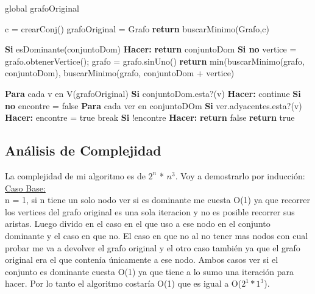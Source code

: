 global grafoOriginal

\begin{codebox}
\li	c = crearConj()
\li	grafoOriginal = Grafo
\li	\textbf{return} buscarMinimo(Grafo,c)
\end{codebox}

\begin{codebox}
\li\textbf{Si} esDominante(conjuntoDom) \textbf{Hacer:} \Do
\li		\textbf{return} conjuntoDom 
\End
\li	\textbf{Si no}  \Do
\li		vertice = grafo.obtenerVertice(); 
\li		grafo = grafo.sinUno()
\li		\textbf{return} min(buscarMinimo(grafo, conjuntoDom), buscarMinimo(grafo, conjuntoDom + vertice)	
\End

\end{codebox}

\begin{codebox}
\li \textbf{Para} cada v en V(grafoOriginal) \Do
\li \textbf{Si} conjuntoDom.esta?(v) \textbf{Hacer:} \Do
\li			continue 
		\End
\li \textbf{Si no}  \Do
\li			encontre = false
\li \textbf{Para} cada ver en conjuntoDOm \Do
\li	\textbf{Si} ver.adyacentes.esta?(v) \textbf{Hacer:} \Do	
\li			encontre = true
\li			break
			\End
	\End		
\li	\textbf{Si} !encontre \textbf{Hacer:} \Do				
\li		\textbf{return} false
			\End		
	\End
\li	\textbf{return} true
\End
\end{codebox}

\subsection{Análisis de Complejidad}

La complejidad de mi algoritmo es de $2^n$ * $n^3$. Voy a demostrarlo por inducción:\\

\underline{Caso Base:}\\

n = 1, si n tiene un solo nodo ver si es dominante me cuesta O(1) ya que recorrer los vertices del grafo original es una sola iteracion y no es posible recorrer sus aristas. Luego divido en el caso en el que uso a ese nodo en el conjunto dominante y el caso en que no. El caso en que no al no tener mas nodos con cual probar me va a devolver el grafo original y el otro caso también ya que el grafo original era el que contenía únicamente a ese nodo. Ambos casos ver si el conjunto es dominante cuesta O(1) ya que tiene a lo sumo una iteración para hacer. Por lo tanto el algoritmo costaría O(1) que es igual a O($2^1*1^3$).\\

